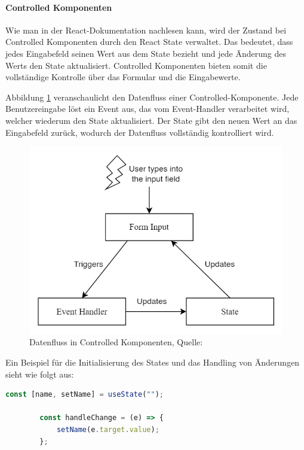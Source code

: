         \paragraph{Controlled Komponenten}
        Wie man in der React-Dokumentation \cite{react_forms} nachlesen kann, wird der Zustand bei Controlled Komponenten durch den React State verwaltet. Das bedeutet, dass jedes Eingabefeld seinen Wert aus dem State bezieht und jede Änderung des Werts den State aktualisiert. Controlled Komponenten bieten somit die vollständige Kontrolle über das Formular und die Eingabewerte.
        
        Abbildung \ref{fig:controlled-component} veranschaulicht den Datenfluss einer Controlled-Komponente. Jede Benutzereingabe löst ein Event aus, das vom Event-Handler verarbeitet wird, welcher wiederum den State aktualisiert. Der State gibt den neuen Wert an das Eingabefeld zurück, wodurch der Datenfluss vollständig kontrolliert wird.
        
        \begin{figure}[H]
            \centering
            \includegraphics[width=0.7\linewidth]{images/controlledComponent.png}
            \caption{Datenfluss in Controlled Komponenten, Quelle: \cite{controlled_inputs_diagram}}
            \label{fig:controlled-component}
        \end{figure}

        Ein Beispiel für die Initialisierung des States und das Handling von Änderungen sieht wie folgt aus:
        
        \begin{lstlisting}[language=JavaScript]
        const [name, setName] = useState(""); 
        
        const handleChange = (e) => {
            setName(e.target.value); 
        };
        \end{lstlisting}
        
